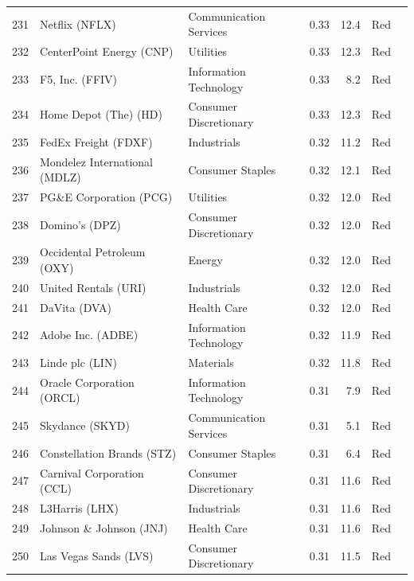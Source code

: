 \documentclass[11pt,a4paper]{article}
\begin{document}
{\begin{longtable}{r p{4.4cm} p{2.8cm} r r l l}
231 & Netflix (NFLX) & Communication Services & 0.33 & 12.4 & \cellcolor[HTML]{F4B6B6}Red &  \\
232 & CenterPoint Energy (CNP) & Utilities & 0.33 & 12.3 & \cellcolor[HTML]{F4B6B6}Red &  \\
233 & F5, Inc. (FFIV) & Information Technology & 0.33 & 8.2 & \cellcolor[HTML]{F4B6B6}Red &  \\
234 & Home Depot (The) (HD) & Consumer Discretionary & 0.33 & 12.3 & \cellcolor[HTML]{F4B6B6}Red &  \\
235 & FedEx Freight (FDXF) & Industrials & 0.32 & 11.2 & \cellcolor[HTML]{F4B6B6}Red &  \\
236 & Mondelez International (MDLZ) & Consumer Staples & 0.32 & 12.1 & \cellcolor[HTML]{F4B6B6}Red &  \\
237 & PG\&E Corporation (PCG) & Utilities & 0.32 & 12.0 & \cellcolor[HTML]{F4B6B6}Red &  \\
238 & Domino's (DPZ) & Consumer Discretionary & 0.32 & 12.0 & \cellcolor[HTML]{F4B6B6}Red &  \\
239 & Occidental Petroleum (OXY) & Energy & 0.32 & 12.0 & \cellcolor[HTML]{F4B6B6}Red &  \\
240 & United Rentals (URI) & Industrials & 0.32 & 12.0 & \cellcolor[HTML]{F4B6B6}Red &  \\
241 & DaVita (DVA) & Health Care & 0.32 & 12.0 & \cellcolor[HTML]{F4B6B6}Red &  \\
242 & Adobe Inc. (ADBE) & Information Technology & 0.32 & 11.9 & \cellcolor[HTML]{F4B6B6}Red &  \\
243 & Linde plc (LIN) & Materials & 0.32 & 11.8 & \cellcolor[HTML]{F4B6B6}Red &  \\
244 & Oracle Corporation (ORCL) & Information Technology & 0.31 & 7.9 & \cellcolor[HTML]{F4B6B6}Red &  \\
245 & Skydance (SKYD) & Communication Services & 0.31 & 5.1 & \cellcolor[HTML]{F4B6B6}Red &  \\
246 & Constellation Brands (STZ) & Consumer Staples & 0.31 & 6.4 & \cellcolor[HTML]{F4B6B6}Red &  \\
247 & Carnival Corporation (CCL) & Consumer Discretionary & 0.31 & 11.6 & \cellcolor[HTML]{F4B6B6}Red &  \\
248 & L3Harris (LHX) & Industrials & 0.31 & 11.6 & \cellcolor[HTML]{F4B6B6}Red &  \\
249 & Johnson \& Johnson (JNJ) & Health Care & 0.31 & 11.6 & \cellcolor[HTML]{F4B6B6}Red &  \\
250 & Las Vegas Sands (LVS) & Consumer Discretionary & 0.31 & 11.5 & \cellcolor[HTML]{F4B6B6}Red &  \\

\end{longtable}}
\end{document}
